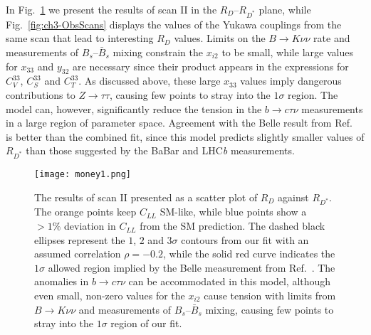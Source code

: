 In Fig.~\ref{fig:ch3-money1} we present the results of scan II in the
$R_D$--$R_{D^*}$ plane, while Fig.~\ref{fig:ch3-ObsScans} displays the values of the
Yukawa couplings from the same scan that lead to interesting $R_D$ values.
Limits on the $B \to K \nu \nu$ rate and measurements of $B_s$--$\bar{B}_s$
mixing constrain the $x_{i2}$ to be small, while large values for $x_{33}$ and
$y_{32}$ are necessary since their product appears in the expressions for $C_{ V
}^{33}$, $C_{ S }^{33}$ and $C_{ T }^{33}$. As discussed above, these large
$x_{33}$ values imply dangerous contributions to $Z \to \tau \tau$, causing few
points to stray into the $1\sigma$ region. The model can, however, significantly
reduce the tension in the $b\to c \tau \nu$ measurements in a large region of
parameter space. Agreement with the Belle result from
Ref.~\cite{Huschle:ch3-2015rga} is better than the combined fit, since this model
predicts slightly smaller values of $R_{D^*}$ than those suggested by the BaBar
and LHC\textit{b} measurements.

\begin{figure}[t]
  \centering \texttt{[image: money1.png]}
  \caption[The results of scan II presented as a scatter plot of $R_D$ against
  $R_{D^*}$.]{The results of scan II presented as a scatter plot of $R_D$
    against $R_{D^*}$. The orange points keep $C_{LL}$ SM-like, while blue
    points show a $> 1\%$ deviation in $C_{LL}$ from the SM prediction. The
    dashed black ellipses represent the $1$, $2$ and $3\sigma$ contours from our
    fit with an assumed correlation $\rho = -0.2$, while the solid red curve
    indicates the $1\sigma$ allowed region implied by the Belle measurement from
    Ref.~\cite{Huschle:2015rga}. The anomalies in $b \to c \tau \nu$ can be
    accommodated in this model, although even small, non-zero values for the
    $x_{i2}$ cause tension with limits from $B \to K \nu \nu$ and measurements
    of $B_s$--$\bar{B}_s$ mixing, causing few points to stray into the $1\sigma$
    region of our fit.}
  \label{fig:ch3-money1}
\end{figure}


